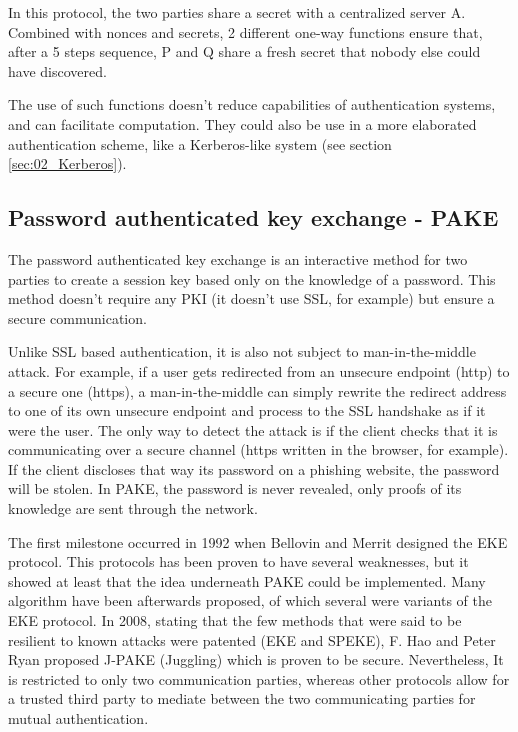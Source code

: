 In this protocol, the two parties share a secret with a centralized server A. Combined with nonces and secrets, 2 different one-way functions ensure that, after a 5 steps sequence, P and Q share a fresh secret that nobody else could have discovered.

The use of such functions doesn't reduce capabilities of authentication systems, and can facilitate computation. They could also be use in a more elaborated authentication scheme, like a Kerberos-like system (see section \ref{sec:02_Kerberos}).

\subsection{Password authenticated key exchange - PAKE}
The password authenticated key exchange is an interactive method for two parties to create a session key based only on the knowledge of a password. This method doesn't require any PKI (it doesn't use SSL, for example) but ensure a secure communication.

Unlike SSL based authentication, it is also not subject to man-in-the-middle attack. For example, if a user gets redirected from an unsecure endpoint (http) to a secure one (https), a man-in-the-middle can simply rewrite the redirect address to one of its own unsecure endpoint and process to the SSL handshake as if it were the user. The only way to detect the attack is if the client checks that it is communicating over a secure channel (https written in the browser, for example). If the client discloses that way its password on a phishing website, the password will be stolen. In PAKE, the password is never revealed, only proofs of its knowledge are sent through the network.

The first milestone occurred in 1992 when Bellovin and Merrit designed the EKE protocol\cite{Bellovin1992}. This protocols has been proven to have several weaknesses, but it showed at least that the idea underneath PAKE could be implemented. Many algorithm have been afterwards proposed, of which several were variants of the EKE protocol. In 2008, stating that the few methods that were said to be resilient to known attacks were patented (EKE\cite{bellovin1993cryptographic} and SPEKE\cite{jablon2001cryptographic}), F. Hao and Peter Ryan proposed J-PAKE (Juggling) which is proven to be secure\cite{hao2010j}\cite{Hao2011}. Nevertheless, It is restricted to only two communication parties, whereas other protocols allow for a trusted third party to mediate between the two communicating parties for mutual authentication\cite{gong1993protecting}\cite{gong1995optimal}.

